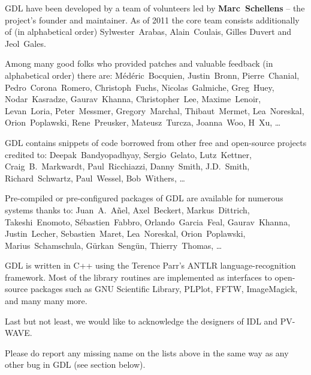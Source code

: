 
GDL have been developed by a team of volunteers led by {\bf Marc~Schellens} --
  the project's founder and maintainer.
As of 2011 the core team consists additionally of (in alphabetical order)
  Sylwester~Arabas, Alain~Coulais, Gilles Duvert and Jeol~Gales.

Among many good folks who provided patches and valuable feedback (in alphabetical order) there are:
M\'ed\'eric~Bocquien, %
Justin~Bronn, %
Pierre~Chanial, %
Pedro~Corona~Romero, %
Christoph~Fuchs, %
Nicolas~Galmiche, %
Greg~Huey, %
Nodar~Kasradze, %
Gaurav~Khanna, %
Christopher~Lee, %
Maxime~Lenoir, %
Levan~Loria, %
Peter~Messmer, %
Gregory~Marchal, %
Thibaut~Mermet, %
Lea~Noreskal, %
Orion~Poplawski, %
Rene~Preusker, %
Mateusz~Turcza, %
Joanna~Woo, %
H~Xu, %
\ldots

GDL contains snippets of code borrowed from other free and open-source projects credited to:
Deepak~Bandyopadhyay, %
Sergio~Gelato, %
Lutz~Kettner, %
Craig~B.~Markwardt, %
Paul~Ricchiazzi, %
Danny~Smith, %
J.D.~Smith, %
Richard~Schwartz, %
Paul~Wessel, %
Bob~Withers, %
\ldots

Pre-compiled or pre-configured packages of GDL are available for numerous systems thanks to:
Juan~A.~A\~nel, %
Axel~Beckert, %
Markus~Dittrich, %
Takeshi~Enomoto, %
S\'ebastien~Fabbro, %
Orlando~Garcia~Feal, %
Gaurav~Khanna, %
Justin~Lecher, %
Sebastien~Maret, %
Lea~Noreskal, %
Orion~Poplawski, %
Marius~Schamschula, %
G\"urkan~Seng\"un, %
Thierry~Thomas, %
\ldots

GDL is written in C++ using the Terence Parr's ANTLR language-recognition framework. 
Most of the library routines are implemented as interfaces to open-source packages 
  such as GNU Scientific Library, PLPlot, FFTW, ImageMagick, and many many more. 

Last but not least, we would like to acknowledge the designers of IDL and PV-WAVE.

Please do report any missing name on the lists above in the same way
  as any other bug in GDL (see section below).
